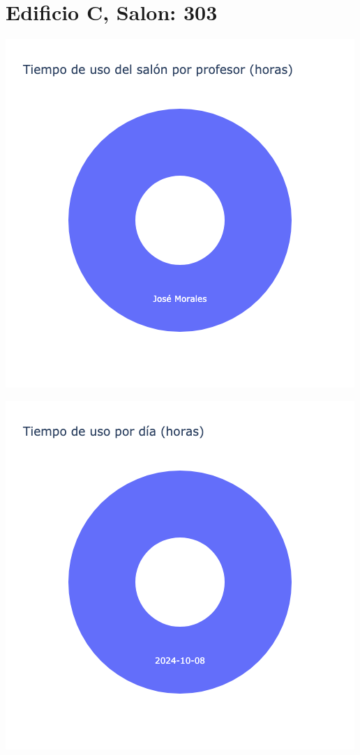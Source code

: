 \documentclass{article}
\begin{document}
    \section{Edificio C, Salon: 303}
    \noindent
    \begin{minipage}{0.48\textwidth}
        \centering
        \includegraphics[width=\textwidth]{../img/pie/UP303-90Dias-03-12-2024.png}
    \end{minipage}
    \hfill
    \begin{minipage}{0.48\textwidth}
        \centering
        \includegraphics[width=\textwidth]{../img/pie/UD303-90Dias-03-12-2024.png}
    \end{minipage}
    
\end{document}
